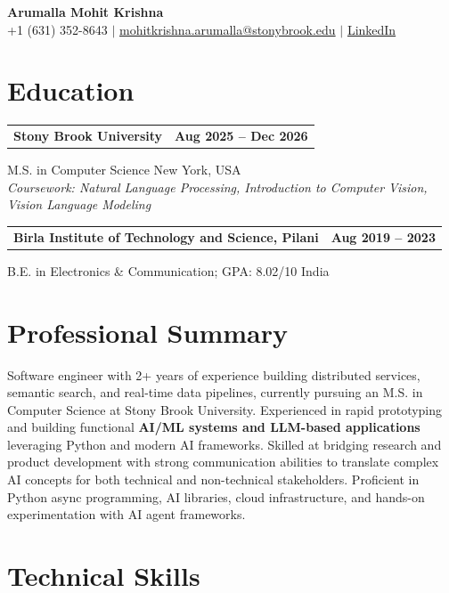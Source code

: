 \documentclass[letterpaper,10pt]{article}
\makeatletter
\newcommand{\entry}[2]{%
  \noindent
  \begin{tabularx}{\linewidth}
    {@{}>{\raggedright\arraybackslash}X@{\hspace{6pt}}r@{}}
    \textbf{#1} & #2
  \end{tabularx}\par
}
\makeatother
\begin{document}
\begin{center}
    {\LARGE\bfseries Arumalla Mohit Krishna}\\[3pt]
    +1 (631) 352-8643 $|$
    \href{mailto:mohitkrishna.arumalla@stonybrook.edu}
    {mohitkrishna.arumalla@stonybrook.edu} $|$
    \href{https://linkedin.com/in/mohit-krishna-arumalla}
    {LinkedIn}
\end{center}
\vspace{-8pt}

\section{Education}

\entry
  {\textbf{Stony Brook University}}
  {\textbf{Aug 2025 -- Dec 2026}}

M.S. in Computer Science \hfill New York, USA\\
\textit{
Coursework: Natural Language Processing,
Introduction to Computer Vision, Vision Language Modeling
}
\vspace{3pt}

\entry
  {\textbf{Birla Institute of Technology and Science, Pilani}}
  {\textbf{Aug 2019 -- 2023}}

B.E. in Electronics \& Communication; GPA: 8.02/10 \hfill India
\section{Professional Summary}

Software engineer with 2+ years of experience building distributed services, semantic search, and real-time data pipelines, currently pursuing an M.S. in Computer Science at Stony Brook University. Experienced in rapid prototyping and building functional \textbf{AI/ML systems and LLM-based applications} leveraging Python and modern AI frameworks. Skilled at bridging research and product development with strong communication abilities to translate complex AI concepts for both technical and non-technical stakeholders. Proficient in Python async programming, AI libraries, cloud infrastructure, and hands-on experimentation with AI agent frameworks.

\section{Technical Skills}
\end{document}
